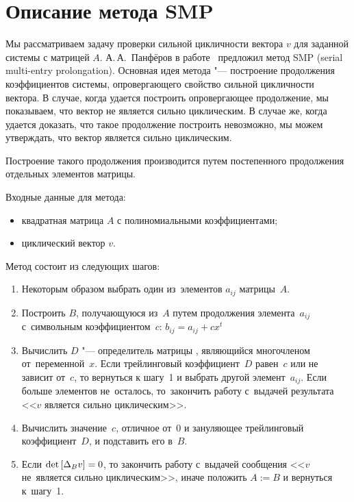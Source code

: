 \section{Описание метода SMP}

Мы рассматриваем задачу проверки сильной цикличности вектора $v$ для заданной системы с матрицей $A$.
А.\,А.~Панфёров в работе~\cite{litPanferov} предложил метод SMP (serial multi-entry prolongation).
Основная идея метода "--- построение продолжения коэффициентов системы,
опровергающего свойство сильной цикличности вектора.
В случае, когда удается построить опровергающее продолжение, мы показываем, что вектор не является сильно циклическим.
В случае же, когда удается доказать, что такое продолжение построить невозможно,
мы можем утверждать, что вектор является сильно циклическим.

Построение такого продолжения производится путем постепенного продолжения отдельных элементов матрицы.
\medskip

Входные данные для метода:
\begin{itemize}
    \item
        квадратная матрица $A$ с полиномиальными коэффициентами;
    \item
        циклический вектор $v$.
\end{itemize}

Метод состоит из следующих шагов:
\begin{enumerate}
    \item
        Некоторым образом выбрать один из~элементов $a_{ij}$ матрицы~$A$.
    \item
        Построить $B$, получающуюся из~$A$ путем продолжения элемента~$a_{ij}$ с~символьным коэффициентом~$c$:
        $b_{ij} = a_{ij} + cx^t$
    \item
        Вычислить $D$ "--- определитель матрицы \diffMatrix[B], являющийся многочленом от~переменной~$x$.
        Если трейлинговый коэффициент~$D$ равен~$c$ или не зависит от~$c$, то вернуться к шагу~1 и выбрать другой элемент~$a_{ij}$.
        Если больше элементов не~осталось, то~закончить работу с~выдачей результата <<$v$ является сильно циклическим>>.
    \item
        Вычислить значение~$c$, отличное от~0 и зануляющее трейлинговый коэффициент~$D$, и подставить его в~$B$.
    \item
        Если $\mathop{\rm det}\text{$ [\Delta_B v] $} = 0$, то закончить работу с~выдачей сообщения <<$v$ не~является сильно циклическим>>,
        иначе положить $A := B$ и вернуться к~шагу~1.
\end{enumerate}

